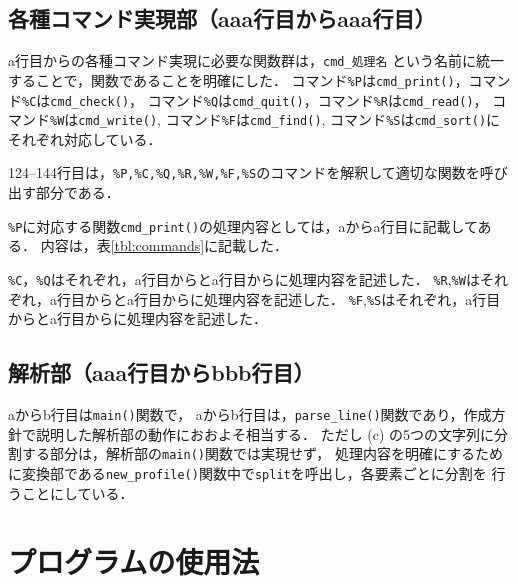 \documentclass[a4j,11pt]{jarticle}
\begin{document}
\subsection{各種コマンド実現部（aaa行目からaaa行目）}
a行目からの各種コマンド実現に必要な関数群は，\verb|cmd_処理名| という名前に統一することで，関数であることを明確にした．
コマンド\verb|%P|は\verb|cmd_print()|，コマンド\verb|%C|は\verb|cmd_check()|，
コマンド\verb|%Q|は\verb|cmd_quit()|，コマンド\verb|%R|は\verb|cmd_read()|，
コマンド\verb|%W|は\verb|cmd_write()|, コマンド\verb|%F|は\verb|cmd_find()|, 
コマンド\verb|%S|は\verb|cmd_sort()|にそれぞれ対応している．

124--144行目は，\verb|%P,%C,%Q,%R,%W,%F,%S|のコマンドを解釈して適切な関数を呼び出す部分である．

\verb|%P|に対応する関数\verb|cmd_print()|の処理内容としては，aからa行目に記載してある．
内容は，表\ref{tbl:commands}に記載した．

\verb|%C|，\verb|%Q|はそれぞれ，a行目からとa行目からに処理内容を記述した．
\verb|%R|,\verb|%W|はそれぞれ，a行目からとa行目からに処理内容を記述した．
\verb|%F|,\verb|%S|はそれぞれ，a行目からとa行目からに処理内容を記述した．

\subsection{解析部（aaa行目からbbb行目）}
aからb行目は\verb|main()|関数で，
aからb行目は，\verb|parse_line()|関数であり，作成方針で説明した解析部の動作におおよそ相当する．
ただし (c) の5つの文字列に分割する部分は，解析部の\verb|main()|関数では実現せず，
処理内容を明確にするために変換部である\verb|new_profile()|関数中で\verb|split|を呼出し，各要素ごとに分割を
行うことにしている．

\section{プログラムの使用法}\label{sec:use}

\end{document}
